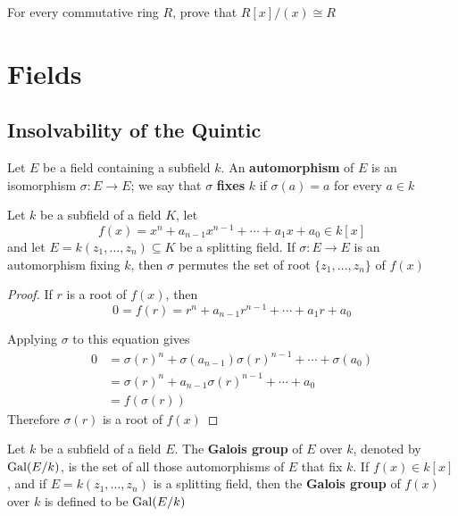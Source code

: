 \documentclass[11pt]{article}
\begin{document}
\begin{exercise}
\label{ex3.83}
For every commutative ring \(R\), prove that \(R[x]/(x)\cong R\)
\end{exercise}
\section{Fields}
\label{sec:org1b9c524}
\subsection{Insolvability of the Quintic}
\label{sec:orgf87ef27}
\begin{definition}[]
Let \(E\) be a field containing a subfield \(k\). An \textbf{automorphism} of \(E\) is an
isomorphism \(\sigma:E\to E\); we say that \(\sigma\) \textbf{fixes} \(k\) if \(\sigma(a)=a\) for every 
\(a\in k\)
\end{definition}

\begin{proposition}[]
\label{prop4.1}
Let \(k\) be a subfield of a field \(K\), let 
\begin{equation*}
f(x)=x^n+a_{n-1}x^{n-1}+\cdots+a_1x+a_0\in k[x]
\end{equation*}
and let \(E=k(z_1,\dots,z_n)\subseteq K\) be a splitting field. If 
\(\sigma:E\to E\) is an automorphism fixing \(k\), then \(\sigma\) permutes the set of root 
\(\{z_1,\dots,z_n\}\) of \(f(x)\)
\end{proposition}

\begin{proof}
If \(r\) is a root of \(f(x)\), then 
\begin{equation*}
0=f(r)=r^n+a_{n-1}r^{n-1}+\cdots+a_1r+a_0
\end{equation*}

Applying \(\sigma\) to this equation gives
\begin{align*}
0&=\sigma(r)^n+\sigma(a_{n-1})\sigma(r)^{n-1}+\cdots+\sigma(a_0)\\
&=\sigma(r)^n+a_{n-1}\sigma(r)^{n-1}+\cdots+a_0\\
&=f(\sigma(r))
\end{align*}
Therefore \(\sigma(r)\) is a root of \(f(x)\)
\end{proof}

\begin{definition}[]
Let \(k\) be a subfield of a field \(E\). The \textbf{Galois group} of \(E\) over \(k\),
denoted by \(\operatorname{Gal}(E/k)\), is the set of all those automorphisms of \(E\) that
fix \(k\). If \(f(x)\in k[x]\), and if \(E=k(z_1,\dots,z_n)\) is a splitting
field, then the \textbf{Galois group} of \(f(x)\) over \(k\) is defined to be \(\operatorname{Gal}(E/k)\)
\end{definition}
\end{document}

